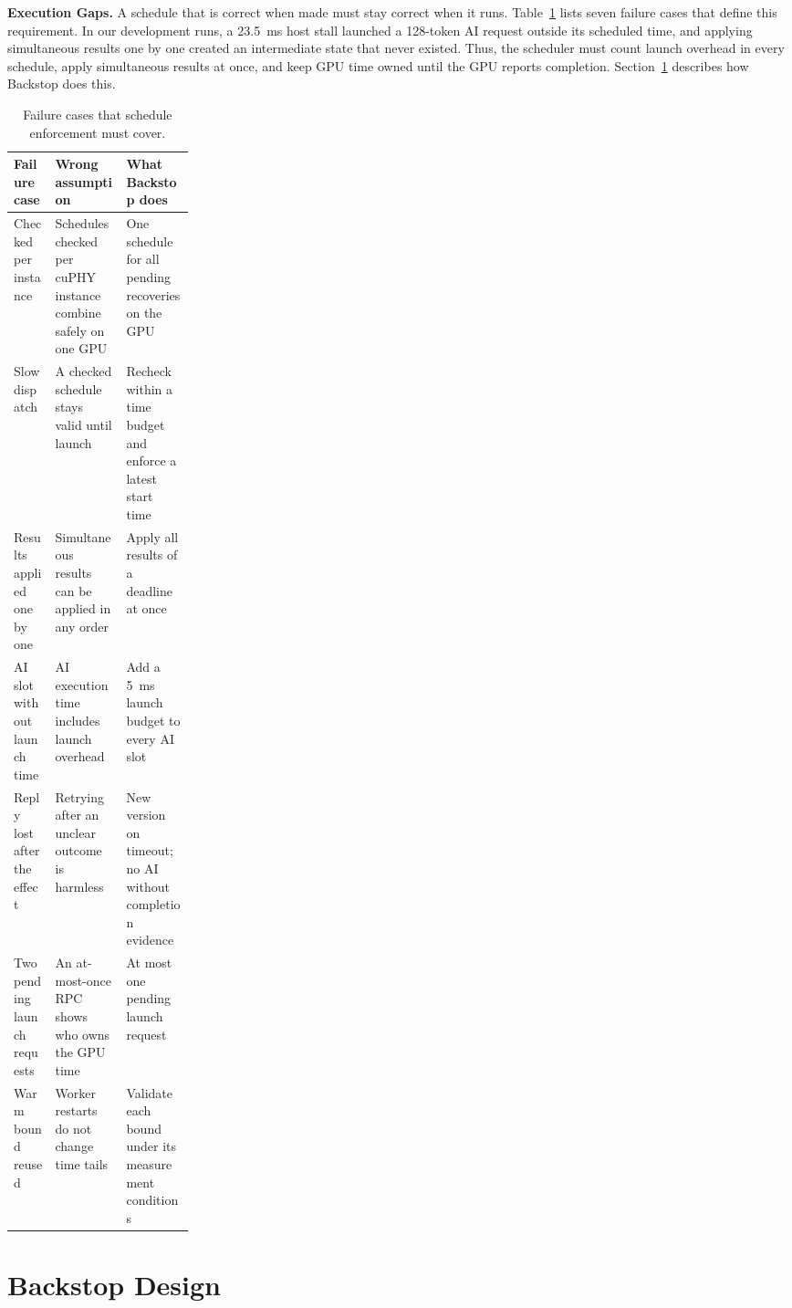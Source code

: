 \documentclass[acmsmall,screen,review,anonymous]{acmart}
\newcommand{\sys}{Backstop\xspace}
\begin{document}
\noindent\textbf{Execution Gaps.}
A schedule that is correct when made must stay correct when it runs. Table~\ref{tab:counterexamples}
lists seven failure cases that define this requirement. In our development runs, a 23.5~ms host stall
launched a 128-token AI request outside its scheduled time, and applying simultaneous results one by one
created an intermediate state that never existed. Thus, the scheduler must count launch overhead in
every schedule, apply simultaneous results at once, and keep GPU time owned until the GPU reports
completion. Section~\ref{sec:design} describes how \sys does this.

\begin{table}[H]
\caption{Failure cases that schedule enforcement must cover.}
\label{tab:counterexamples}
\begin{tabularx}{\linewidth}{@{}>{\raggedright\arraybackslash}p{0.23\linewidth}>{\raggedright\arraybackslash}X>{\raggedright\arraybackslash}X@{}}
\toprule
Failure case & Wrong assumption & What \sys does \\
\midrule
Checked per instance & Schedules checked per cuPHY instance combine safely on one GPU & One schedule for all pending recoveries on the GPU \\
Slow dispatch & A checked schedule stays valid until launch & Recheck within a time budget and enforce a latest start time \\
Results applied one by one & Simultaneous results can be applied in any order & Apply all results of a deadline at once \\
AI slot without launch time & AI execution time includes launch overhead & Add a 5~ms launch budget to every AI slot \\
Reply lost after the effect & Retrying after an unclear outcome is harmless & New version on timeout; no AI without completion evidence \\
Two pending launch requests & An at-most-once RPC shows who owns the GPU time & At most one pending launch request \\
Warm bound reused & Worker restarts do not change time tails & Validate each bound under its measurement conditions \\
\bottomrule
\end{tabularx}
\end{table}

\section{Backstop Design}
\label{sec:design}
\end{document}

